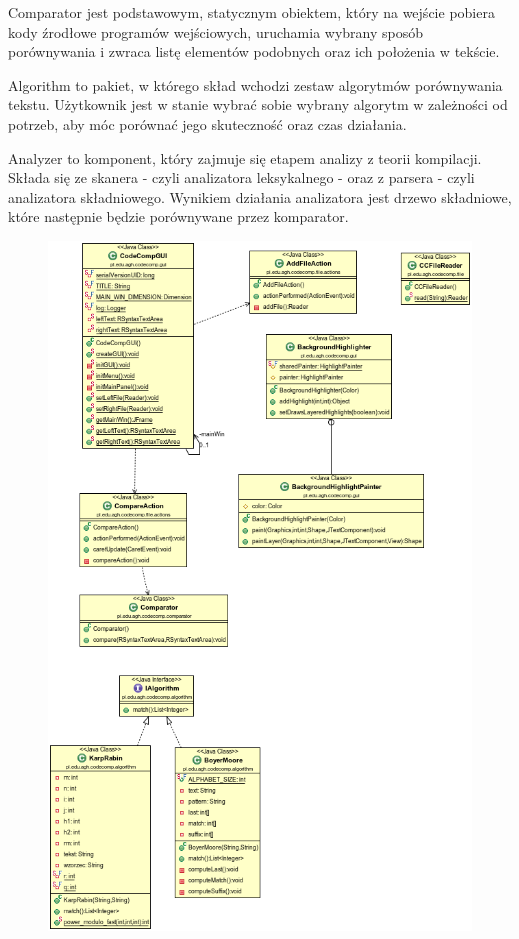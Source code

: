 \documentclass[a4paper,12pt]{article}
\begin{document}
Comparator jest podstawowym, statycznym obiektem, który na wejście pobiera kody źrodłowe programów wejściowych, uruchamia wybrany sposób porównywania i zwraca listę elementów podobnych oraz ich położenia w tekście.

Algorithm to pakiet, w którego skład wchodzi zestaw algorytmów porównywania tekstu. Użytkownik jest w stanie wybrać sobie wybrany algorytm w zależności od potrzeb, aby móc porównać jego skuteczność oraz czas działania.

Analyzer to komponent, który zajmuje się etapem analizy z teorii kompilacji. Składa się ze skanera - czyli analizatora leksykalnego - oraz z parsera - czyli analizatora składniowego. Wynikiem działania analizatora jest drzewo składniowe, które następnie będzie porównywane przez komparator.

\begin{figure}[!]
\centering
\includegraphics[scale=0.6]{gfx/classdiagram.png}
\end{figure}
\end{document}
